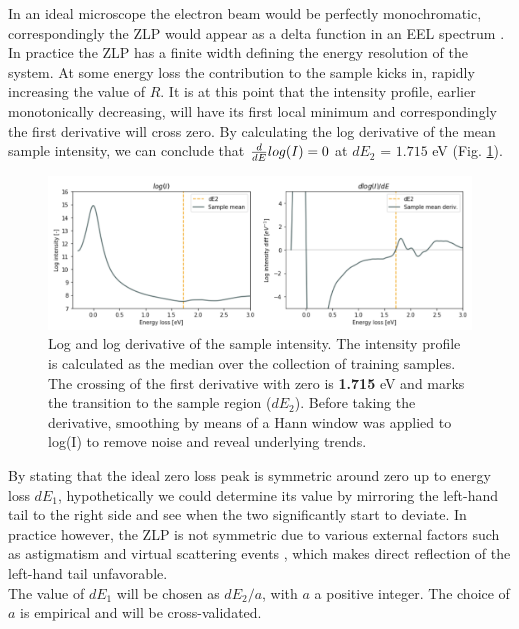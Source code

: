 \documentclass[11pt,a4paper]{article}
\def\frac#1#2{{{#1}\over {#2}}}
\numberwithin{equation}{section}
\numberwithin{figure}{section}
\numberwithin{table}{section}
\begin{document}
In an ideal microscope the electron beam would be perfectly monochromatic, correspondingly the ZLP would appear as a delta function in an EEL spectrum \cite{rafferty}. In practice the ZLP has a finite width defining the energy resolution of the system. At some energy loss the contribution to the sample kicks in, rapidly increasing the value of $R$. It is at this point that the intensity profile, earlier monotonically decreasing, will have its first local minimum and correspondingly the first derivative will cross zero. By calculating the log derivative of the mean sample intensity, we can conclude that  $\frac{d}{dE}log(I)=0$ at $dE_2$ = $1.715$ eV  (Fig. \ref{bound}). 

\begin{figure}[H]
    \centering 
    \includegraphics[width=150mm]{plots/bound.png}
    \caption{Log and log derivative of the sample intensity. The intensity profile is calculated as the median over the collection of training samples. The crossing of the first derivative with zero is \textbf{1.715} eV and marks the transition to the sample region ($dE_2$). Before taking the derivative, smoothing by means of a Hann window \cite{hann} was applied to log(I) to remove noise and reveal underlying trends. }
    \label{bound}
\end{figure}

By stating that the ideal zero loss peak is symmetric around zero up to energy loss $dE_1$, hypothetically we could determine its value by mirroring the left-hand tail to the right side and see when the two significantly start to deviate. In practice however, the ZLP is not symmetric due to various external factors such as astigmatism \cite{astigma} and virtual scattering events \cite{rafferty}, which makes direct reflection of the left-hand tail unfavorable. \\
The value of $dE_1$ will be chosen as $dE_2 / a$, with $a$ a positive integer. The choice of $a$ is empirical and will be cross-validated. \\ \newpage
\end{document}
